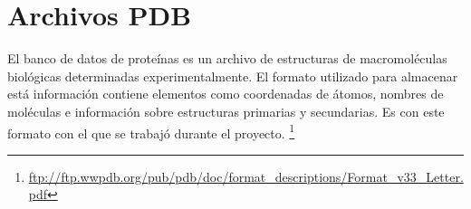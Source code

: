 \section{Archivos PDB}
El banco de datos de proteínas es un archivo de estructuras de
macromoléculas biológicas determinadas experimentalmente. El formato
utilizado para almacenar está información contiene elementos como
coordenadas de átomos, nombres de moléculas e información sobre
estructuras primarias y secundarias. Es con este formato con el que se
trabajó durante el proyecto.
\footnote{\url{ftp://ftp.wwpdb.org/pub/pdb/doc/format_descriptions/Format_v33_Letter.pdf}}
